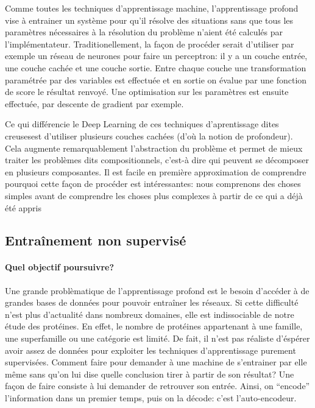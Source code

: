 \documentclass[a4paper, 11pt, onecolumn]{article}
\begin{document}
Comme toutes les techniques d'apprentissage machine, l'apprentissage profond
vise à entrainer un système pour qu'il résolve des situations sans que tous les
paramètres nécessaires à la résolution du problème n'aient été calculés par
l'implémentateur. Traditionellement, la façon de procéder serait d'utiliser par
exemple un réseau de neurones pour faire un perceptron: il y a un couche entrée,
une couche cachée et une couche sortie. Entre chaque couche une transformation
paramétrée par des variables est effectuée et en sortie on évalue par une
fonction de score le résultat renvoyé. Une optimisation sur les paramètres est
ensuite effectuée, par descente de gradient par exemple.

Ce qui différencie le Deep Learning de ces techniques d'aprentissage dites \og
creuses\fg est d'utiliser plusieurs couches cachées (d'où la notion de
profondeur). Cela augmente remarquablement l'abstraction du problème et permet
de mieux traiter les problèmes dits compositionnels, c'est-à dire qui peuvent se
décomposer en plusieurs composantes. Il est facile en première approximation de
comprendre pourquoi cette façon de procéder est intéressantes: nous comprenons
des choses simples avant de comprendre les choses plus complexes à partir de ce
qui a déjà été appris

\subsection{Entraînement non supervisé}

\paragraph{Quel objectif poursuivre?}

Une grande problèmatique de l'apprentissage profond est le besoin d'accéder à de
grandes bases de données pour pouvoir entraîner les réseaux. Si cette difficulté
n'est plus d'actualité dans nombreux domaines, elle est indissociable de notre
étude des protéines. En effet, le nombre de protéines appartenant à une famille,
une superfamille ou une catégorie est limité. De fait, il n'est pas réaliste
d'éspérer avoir assez de données pour exploiter les techniques d'apprentissage
purement supervisées. Comment faire pour demander à une machine de s'entrainer par elle même sans
qu'on lui dise quelle conclusion tirer à partir de son résultat? Une façon de
faire consiste à lui demander de retrouver son entrée. Ainsi, on ``encode''
l'information dans un premier temps, puis on la décode: c'est l'auto-encodeur.
\end{document}

